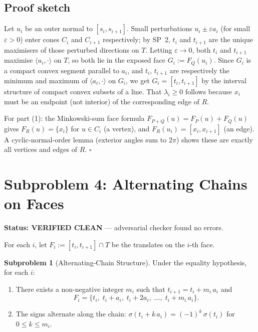 \documentclass[12pt,a4paper]{article}
\theoremstyle{definition}
\newtheorem{subproblem}{Subproblem}
\begin{document}
\subsection*{Proof sketch}

Let $u_i$ be an outer normal to $[s_i,s_{i+1}]$.  Small perturbations
$u_i\pm\varepsilon a_i$ (for small $\varepsilon>0$) enter cones $C_i$ and $C_{i+1}$
respectively; by SP~2, $t_i$ and $t_{i+1}$ are the unique maximisers of those
perturbed directions on $T$.  Letting $\varepsilon\to 0$, both $t_i$ and $t_{i+1}$
maximise $\langle u_i,\cdot\rangle$ on $T$, so both lie in the exposed face
$G_i:=F_Q(u_i)$.  Since $G_i$ is a compact convex segment parallel to $a_i$,
and $t_i$, $t_{i+1}$ are respectively the minimum and maximum of $\langle a_i,\cdot\rangle$
on $G_i$, we get $G_i=[t_i,t_{i+1}]$ by the interval structure of compact convex
subsets of a line.  That $\lambda_i\ge 0$ follows because $x_i$ must be an endpoint
(not interior) of the corresponding edge of $R$.

For part (1): the Minkowski-sum face formula $F_{P+Q}(u)=F_P(u)+F_Q(u)$
gives $F_R(u)=\{x_i\}$ for $u\in C_i$ (a vertex), and $F_R(u_i)=[x_i,x_{i+1}]$
(an edge).  A cyclic-normal-order lemma (exterior angles sum to $2\pi$) shows these
are exactly all vertices and edges of $R$. $\square$

\section{Subproblem 4: Alternating Chains on Faces}

\begin{cleanenv}
\textbf{Status: VERIFIED CLEAN} --- adversarial checker found no errors.
\end{cleanenv}

For each $i$, let $F_i:=[t_i,t_{i+1}]\cap T$ be the translates on the $i$-th face.

\begin{subproblem}[Alternating-Chain Structure]\label{sp:4}
Under the equality hypothesis, for each $i$:
\begin{enumerate}[label=(\arabic*)]
\item There exists a non-negative integer $m_i$ such that $t_{i+1}=t_i+m_i\,a_i$ and
\[
  F_i = \{t_i,\; t_i+a_i,\; t_i+2a_i,\;\ldots,\; t_i+m_i\,a_i\}.
\]
\item The signs alternate along the chain:
      $\sigma(t_i+k\,a_i)=(-1)^k\,\sigma(t_i)$ for $0\le k\le m_i$.
\end{enumerate}
\end{subproblem}
\end{document}
